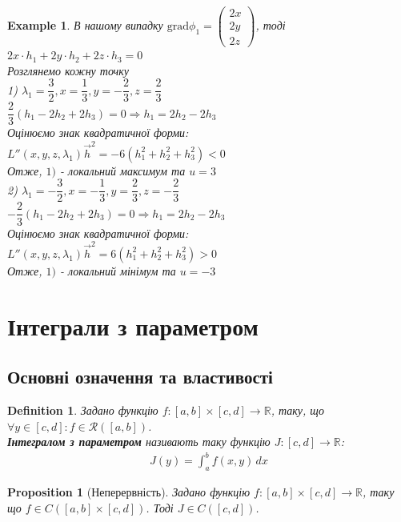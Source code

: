 \documentclass[a4paper, 10pt]{article}
\def\bigline{\vspace{5mm}\\}
\theoremstyle{theoremdd}
\theoremstyle{theoremdd}
\theoremstyle{theoremdd}
\newtheorem{definition}[theorem]{Definition}
\theoremstyle{theoremdd}
\theoremstyle{theoremdd}
\newtheorem{example}[theorem]{Example}
\theoremstyle{theoremdd}
\newtheorem{proposition}[theorem]{Proposition}
\theoremstyle{theoremdd}
\theoremstyle{theoremdd}
\theoremstyle{theoremdd}
\begin{document}
\begin{example}
В нашому випадку $\textrm{grad} \phi_1 = \begin{pmatrix}
2x \\ 2y \\ 2z
\end{pmatrix}$, тоді\\
$2x \cdot h_1 + 2y \cdot h_2 + 2z \cdot h_3 = 0$\\
Розглянемо кожну точку\\
1) $\lambda_1 = \dfrac{3}{2}, x = \dfrac{1}{3}, y = -\dfrac{2}{3}, z = \dfrac{2}{3}$\\
$\dfrac{2}{3} \left(h_1 - 2h_2 + 2h_3 \right) = 0 \Rightarrow h_1 = 2h_2 - 2h_3$\\
Оцінюємо знак квадратичної форми:\\
$L''(x,y,z,\lambda_1) \vec{h}^2 = -6(h_1^2+h_2^2+h_3^2) < 0$\\
Отже, $1)$ - локальний максимум та $u = 3$
\bigline
2) $\lambda_1 = -\dfrac{3}{2}, x = -\dfrac{1}{3}, y = \dfrac{2}{3}, z = -\dfrac{2}{3}$\\
$-\dfrac{2}{3} \left(h_1 - 2h_2 + 2h_3 \right) = 0 \Rightarrow h_1 = 2h_2 - 2h_3$\\
Оцінюємо знак квадратичної форми:\\
$L''(x,y,z,\lambda_1) \vec{h}^2 = 6(h_1^2+h_2^2+h_3^2) > 0$\\
Отже, $1)$ - локальний мінімум та $u = -3$
\end{example}
\fi
\newpage

\section{Інтеграли з параметром}
\subsection{Основні означення та властивості}
\begin{definition}
Задано функцію $f: [a,b] \times [c,d] \to \mathbb{R}$, таку, що $\forall y \in [c,d]: f \in \mathcal{R}([a,b])$.\\
\textbf{Інтегралом з параметром} називають таку функцію $J: [c,d] \to \mathbb{R}$:
\begin{align*}
J(y) = \int_a^b f(x,y)\,dx
\end{align*}
\end{definition}

\begin{proposition}[Неперервність]
Задано функцію $f: [a,b] \times [c,d] \to \mathbb{R}$, таку що $f \in C([a,b] \times [c,d])$. Тоді $J \in C([c,d])$.
\end{proposition}
\end{document}
